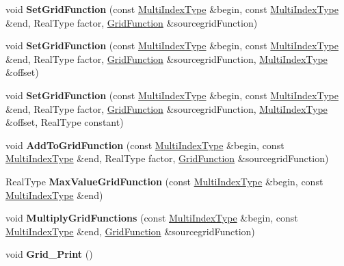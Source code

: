 \begin{DoxyCompactItemize}
\item 
\hypertarget{class_grid_function_a7d8edd7866f90b7c2f2c4ec0de9e4c3f}{void {\bfseries Set\-Grid\-Function} (const \hyperlink{class_array}{Multi\-Index\-Type} \&begin, const \hyperlink{class_array}{Multi\-Index\-Type} \&end, Real\-Type factor, \hyperlink{class_grid_function}{Grid\-Function} \&sourcegrid\-Function)}\label{class_grid_function_a7d8edd7866f90b7c2f2c4ec0de9e4c3f}

\item 
\hypertarget{class_grid_function_a6569012ef6320b82d010459993dbdb19}{void {\bfseries Set\-Grid\-Function} (const \hyperlink{class_array}{Multi\-Index\-Type} \&begin, const \hyperlink{class_array}{Multi\-Index\-Type} \&end, Real\-Type factor, \hyperlink{class_grid_function}{Grid\-Function} \&sourcegrid\-Function, \hyperlink{class_array}{Multi\-Index\-Type} \&offset)}\label{class_grid_function_a6569012ef6320b82d010459993dbdb19}

\item 
\hypertarget{class_grid_function_a0890154fd279cf93ae794924c8684d58}{void {\bfseries Set\-Grid\-Function} (const \hyperlink{class_array}{Multi\-Index\-Type} \&begin, const \hyperlink{class_array}{Multi\-Index\-Type} \&end, Real\-Type factor, \hyperlink{class_grid_function}{Grid\-Function} \&sourcegrid\-Function, \hyperlink{class_array}{Multi\-Index\-Type} \&offset, Real\-Type constant)}\label{class_grid_function_a0890154fd279cf93ae794924c8684d58}

\item 
\hypertarget{class_grid_function_a756e723cad5230def9848b32eba10d88}{void {\bfseries Add\-To\-Grid\-Function} (const \hyperlink{class_array}{Multi\-Index\-Type} \&begin, const \hyperlink{class_array}{Multi\-Index\-Type} \&end, Real\-Type factor, \hyperlink{class_grid_function}{Grid\-Function} \&sourcegrid\-Function)}\label{class_grid_function_a756e723cad5230def9848b32eba10d88}

\item 
\hypertarget{class_grid_function_a430e498104762b7502bb095db0973aed}{Real\-Type {\bfseries Max\-Value\-Grid\-Function} (const \hyperlink{class_array}{Multi\-Index\-Type} \&begin, const \hyperlink{class_array}{Multi\-Index\-Type} \&end)}\label{class_grid_function_a430e498104762b7502bb095db0973aed}

\item 
\hypertarget{class_grid_function_a2661f54b4e5be6b1cc0420c2ffb63b3b}{void {\bfseries Multiply\-Grid\-Functions} (const \hyperlink{class_array}{Multi\-Index\-Type} \&begin, const \hyperlink{class_array}{Multi\-Index\-Type} \&end, \hyperlink{class_grid_function}{Grid\-Function} \&sourcegrid\-Function)}\label{class_grid_function_a2661f54b4e5be6b1cc0420c2ffb63b3b}

\item 
\hypertarget{class_grid_function_a438366ad02bfeaf9e4171f74c019a71b}{void {\bfseries Grid\-\_\-\-Print} ()}\label{class_grid_function_a438366ad02bfeaf9e4171f74c019a71b}

\end{DoxyCompactItemize}
